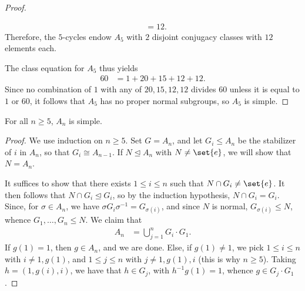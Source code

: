 \documentclass[10pt]{mypackage}
\begin{document}
\begin{proof}
\begin{itemize}
\begin{align*}
                                                            &= 12.
      \end{align*}
      Therefore, the $5$-cycles endow $A_5$ with $2$ disjoint conjugacy classes with $12$ elements each.
  \end{itemize}
  The class equation for $A_5$ thus yields
  \begin{align*}
    60 &= 1 + 20 + 15 +12 + 12.
  \end{align*}
  Since no combination of $1$ with any of $20,15,12,12$ divides $60$ unless it is equal to $1$ or $60$, it follows that $A_5$ has no proper normal subgroups, so $A_5$ is simple.
\end{proof}
\begin{theorem}
  For all $n\geq 5$, $A_n$ is simple.
\end{theorem}
\begin{proof}
  We use induction on $n\geq 5$. Set $G = A_n$, and let $G_i\leq A_n$ be the stabilizer of $i$ in $A_n$, so that $G_i \cong A_{n-1}$. If $N\trianglelefteq A_n$ with $N\neq \set{e}$, we will show that $N = A_n$.%

  It suffices to show that there exists $1\leq i \leq n$ such that $N\cap G_i\neq \set{e}$. It then follows that $N\cap G_i\trianglelefteq G_i$, so by the induction hypothesis, $N\cap G_i = G_i$. Since, for $\sigma\in A_n$, we have $\sigma G_i \sigma^{-1} = G_{\sigma(i)}$, and since $N$ is normal, $G_{\sigma(i)}\leq N$, whence $G_1,\dots,G_n\leq N$. We claim that
  \begin{align*}
    A_n &= \bigcup_{j=1}^{n}G_i\cdot G_1.
  \end{align*}
  If $g(1) = 1$, then $g\in A_n$, and we are done. Else, if $g(1)\neq 1$, we pick $1\leq i \leq n$ with $i\neq 1,g(1)$, and $1\leq j\leq n$ with $j\neq 1,g(1),i$ (this is why $n\geq 5$). Taking $h = \left( 1,g(i),i \right)$, we have that $h\in G_j$, with $h^{-1}g(1) = 1$, whence $g\in G_j\cdot G_1$.%


\end{proof}
\end{document}
